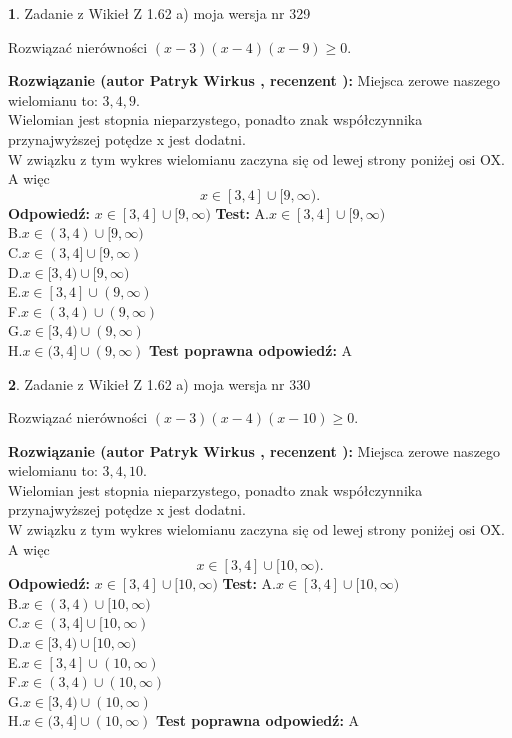\documentclass[12pt, a4paper]{article}
\theoremstyle{definition} %
\newtheorem{zad}{}
\newcommand{\zadStart}[1]{\begin{zad}#1\newline}
\newcommand{\zadStop}{\end{zad}}
\newcommand{\rozwStart}[2]{\noindent \textbf{Rozwiązanie (autor #1 , recenzent #2): }\newline}
\newcommand{\rozwStop}{\newline}
\newcommand{\odpStart}{\noindent \textbf{Odpowiedź:}\newline}
\newcommand{\odpStop}{\newline}
\newcommand{\testStart}{\noindent \textbf{Test:}\newline}
\newcommand{\testStop}{\newline}
\newcommand{\kluczStart}{\noindent \textbf{Test poprawna odpowiedź:}\newline}
\newcommand{\kluczStop}{\newline}
\begin{document}
\zadStart{Zadanie z Wikieł Z 1.62 a) moja wersja nr 329}

Rozwiązać nierówności $(x-3)(x-4)(x-9)\ge0$.
\zadStop
\rozwStart{Patryk Wirkus}{}
Miejsca zerowe naszego wielomianu to: $3, 4, 9$.\\
Wielomian jest stopnia nieparzystego, ponadto znak współczynnika przy\linebreak najwyższej potędze x jest dodatni.\\ W związku z tym wykres wielomianu zaczyna się od lewej strony poniżej osi OX. A więc $$x \in [3,4] \cup [9,\infty).$$
\rozwStop
\odpStart
$x \in [3,4] \cup [9,\infty)$
\odpStop
\testStart
A.$x \in [3,4] \cup [9,\infty)$\\
B.$x \in (3,4) \cup [9,\infty)$\\
C.$x \in (3,4] \cup [9,\infty)$\\
D.$x \in [3,4) \cup [9,\infty)$\\
E.$x \in [3,4] \cup (9,\infty)$\\
F.$x \in (3,4) \cup (9,\infty)$\\
G.$x \in [3,4) \cup (9,\infty)$\\
H.$x \in (3,4] \cup (9,\infty)$
\testStop
\kluczStart
A
\kluczStop



\zadStart{Zadanie z Wikieł Z 1.62 a) moja wersja nr 330}

Rozwiązać nierówności $(x-3)(x-4)(x-10)\ge0$.
\zadStop
\rozwStart{Patryk Wirkus}{}
Miejsca zerowe naszego wielomianu to: $3, 4, 10$.\\
Wielomian jest stopnia nieparzystego, ponadto znak współczynnika przy\linebreak najwyższej potędze x jest dodatni.\\ W związku z tym wykres wielomianu zaczyna się od lewej strony poniżej osi OX. A więc $$x \in [3,4] \cup [10,\infty).$$
\rozwStop
\odpStart
$x \in [3,4] \cup [10,\infty)$
\odpStop
\testStart
A.$x \in [3,4] \cup [10,\infty)$\\
B.$x \in (3,4) \cup [10,\infty)$\\
C.$x \in (3,4] \cup [10,\infty)$\\
D.$x \in [3,4) \cup [10,\infty)$\\
E.$x \in [3,4] \cup (10,\infty)$\\
F.$x \in (3,4) \cup (10,\infty)$\\
G.$x \in [3,4) \cup (10,\infty)$\\
H.$x \in (3,4] \cup (10,\infty)$
\testStop
\kluczStart
A
\kluczStop
\end{document}
